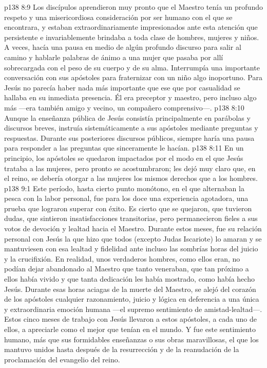 \vs p138 8:9 Los discípulos aprendieron muy pronto que el Maestro tenía un profundo respeto y una misericordiosa consideración por  ser humano con el que se encontrara, y estaban extraordinariamente impresionados ante esta atención que persistente e invariablemente brindaba a toda clase de hombres, mujeres y niños. A veces, hacía una pausa en medio de algún profundo discurso para salir al camino y hablarle palabras de ánimo a una mujer que pasaba por allí sobrecargada con el peso de su cuerpo y de su alma. Interrumpía una importante conversación con sus apóstoles para fraternizar con un niño algo inoportuno. Para Jesús no parecía haber nada más importante que ese  que por casualidad se hallaba en su inmediata presencia. Él era preceptor y maestro, pero incluso algo más ---era también amigo y vecino, un compañero comprensivo---.
\vs p138 8:10 \pc Aunque la enseñanza pública de Jesús consistía principalmente en parábolas y discursos breves, instruía sistemáticamente a sus apóstoles mediante preguntas y respuestas. Durante sus posteriores discursos públicos, siempre haría una pausa para responder a las preguntas que sinceramente le hacían.
\vs p138 8:11 En un principio, los apóstoles se quedaron impactados por el modo en el que Jesús trataba a las mujeres, pero pronto se acostumbraron; les dejó muy claro que, en el reino, se debería otorgar a las mujeres los mismos derechos que a los hombres.
\vs p138 9:1 Este período, hasta cierto punto monótono, en el que alternaban la pesca con la labor personal, fue para los doce una experiencia agotadora, una prueba que lograron superar con éxito. Es cierto que se quejaron, que tuvieron dudas, que sintieron insatisfacciones transitorias, pero permanecieron fieles a sus votos de devoción y lealtad hacia el Maestro. Durante estos meses, fue su relación personal con Jesús la que hizo que todos (excepto Judas Iscariote) lo amaran y se mantuviesen con esa lealtad y fidelidad ante incluso las sombrías horas del juicio y la crucifixión. En realidad, unos verdaderos hombres, como ellos eran, no podían dejar abandonado al Maestro que tanto veneraban, que tan próximo a ellos había vivido y que tanta dedicación les había mostrado, como había hecho Jesús. Durante esas horas aciagas de la muerte del Maestro, se alejó del corazón de los apóstoles cualquier razonamiento, juicio y lógica en deferencia a una única y extraordinaria emoción humana ---el supremo sentimiento de amistad\hyp{}lealtad---. Estos cinco meses de trabajo con Jesús llevaron a estos apóstoles, a cada uno de ellos, a apreciarle como el mejor  que tenían en el mundo. Y fue este sentimiento humano, más que sus formidables enseñanzas o sus obras maravillosas, el que los mantuvo unidos hasta después de la resurrección y de la reanudación de la proclamación del evangelio del reino.

